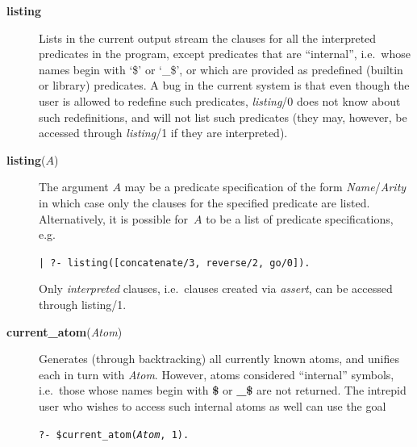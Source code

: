 \begin{description}
\item[{\bf listing}] 
    Lists in the current output stream the clauses for all the interpreted
    predicates in the program, except predicates that are ``internal'',
    i.e.\ whose names begin with `\$' or `\_\$',
    or which are provided as predefined (builtin or library) predicates.
    A bug in the current system is that even though the
    user is allowed to redefine such predicates,
    {\em listing}/0 does not know about such redefinitions,
    and will not list such predicates (they may, however,
    be accessed through {\em listing}/1 if they are interpreted).

\item[{\bf listing}($A$)] 
    The argument $A$ may be a predicate specification of
    the form {\em Name}/{\em Arity} in which case only the clauses for the
    specified predicate are listed.
    Alternatively, it is possible for~$A$ to be a list
    of predicate specifications, e.g.
    \begin{center}
    {\tt | ?- listing([concatenate/3, reverse/2, go/0]).}
    \end{center}
    Only {\em interpreted} clauses, i.e.\ clauses created via {\em assert},
    can be accessed through listing/1.

\item[{\bf current\_atom}({\em Atom})]
    Generates (through backtracking) all currently known atoms, and unifies
    each in turn with {\em Atom}.
    However, atoms considered ``internal'' symbols,
    i.e.\ those whose names begin with {\bf \$} or {\bf \_\$} are not returned.
    The intrepid user who wishes to access such internal atoms as
    well can use the goal
    \begin{center}
    {\tt ?- \$current\_atom({\em Atom}, 1).}
    \end{center}


\end{description}
